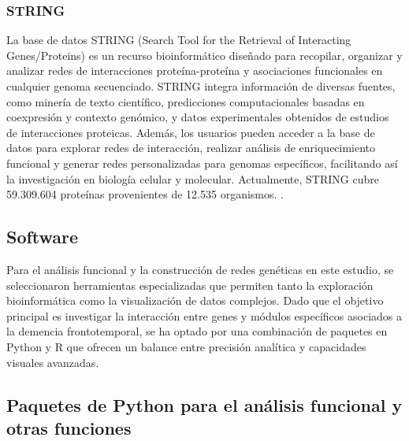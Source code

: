 \subsubsection*{STRING}
La base de datos STRING (Search Tool for the Retrieval of Interacting Genes/Proteins) es un recurso bioinformático diseñado para recopilar, organizar y analizar redes de interacciones proteína-proteína y asociaciones funcionales en cualquier genoma secuenciado. STRING integra información de diversas fuentes, como minería de texto científico, predicciones computacionales basadas en coexpresión y contexto genómico, y datos experimentales obtenidos de estudios de interacciones proteicas. Además, los usuarios pueden acceder a la base de datos para explorar redes de interacción, realizar análisis de enriquecimiento funcional y generar redes personalizadas para genomas específicos, facilitando así la investigación en biología celular y molecular. Actualmente, STRING cubre 59.309.604 proteínas provenientes de 12.535 organismos.  \cite{szklarczyk2023stringdb}.

\subsection{Software}

Para el análisis funcional y la construcción de redes genéticas en este estudio, se seleccionaron herramientas especializadas que permiten tanto la exploración bioinformática como la visualización de datos complejos. Dado que el objetivo principal es investigar la interacción entre genes y módulos específicos asociados a la demencia frontotemporal, se ha optado por una combinación de paquetes en Python y R que ofrecen un balance entre precisión analítica y capacidades visuales avanzadas.

\subsection*{Paquetes de Python para el análisis funcional y otras funciones}

